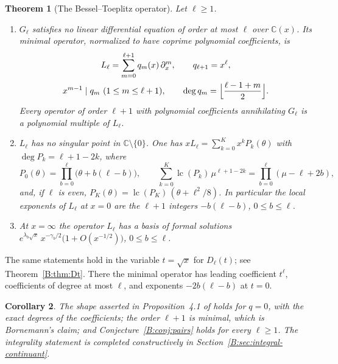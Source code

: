 \documentclass[11pt,a4paper]{article}
\newtheorem{theorem}{Theorem}[section]
\newtheorem{corollary}[theorem]{Corollary}
\theoremstyle{definition}
\theoremstyle{remark}
\newcommand{\C}{\mathbb C}
\DeclareMathOperator{\lc}{lc}
\numberwithin{equation}{section}
\begin{document}
\begin{theorem}[The Bessel--Toeplitz operator]\label{B:thm:A}
Let $\ell\ge1$.
\begin{enumerate}
\item[(a)] $G_\ell$ satisfies no linear differential equation of order at most $\ell$ over $\C(x)$. Its minimal operator, normalized to have coprime polynomial coefficients, is
\[
\begin{gathered}
L_\ell=\sum_{m=0}^{\ell+1}q_m(x)\,\partial_x^m,\qquad q_{\ell+1}=x^\ell,\\
x^{m-1}\mid q_m\ (1\le m\le\ell+1),\qquad
\deg q_m=\Bigl\lfloor\frac{\ell-1+m}{2}\Bigr\rfloor .
\end{gathered}
\]
Every operator of order $\ell+1$ with polynomial coefficients annihilating $G_\ell$ is a polynomial multiple of $L_\ell$.
\item[(b)] $L_\ell$ has no singular point in $\C\setminus\{0\}$. One has $xL_\ell=\sum_{k=0}^{K}x^kP_k(\theta)$ with $\deg P_k=\ell+1-2k$, where
\[
P_0(\theta)=\prod_{b=0}^{\ell}\bigl(\theta+b(\ell-b)\bigr),\qquad \sum_{k=0}^{K}\lc(P_k)\,\mu^{\ell+1-2k}=\prod_{b=0}^{\ell}(\mu-\ell+2b),
\]
and, if $\ell$ is even, $P_K(\theta)=\lc(P_K)\,(\theta+\ell^2/8)$. In particular the local exponents of $L_\ell$ at $x=0$ are the $\ell+1$ integers $-b(\ell-b)$, $0\le b\le \ell$.
\item[(c)] At $x=\infty$ the operator $L_\ell$ has a basis of formal solutions $e^{\lambda_b\sqrt x}\,x^{-\gamma_b/2}\bigl(1+O(x^{-1/2})\bigr)$, $0\le b\le\ell$.
\end{enumerate}
\end{theorem}

The same statements hold in the variable $t=\sqrt x$ for $D_\ell(t)$; see Theorem~\ref{B:thm:Dt}. There the minimal operator has leading coefficient $t^\ell$, coefficients of degree at most $\ell$, and exponents $-2b(\ell-b)$ at $t=0$.

\begin{corollary}\label{B:cor:FW41}
The shape asserted in Proposition~4.1 of \cite{FW26} holds for $q=0$, with the exact degrees of the coefficients; the order $\ell+1$ is minimal, which is Bornemann's claim; and Conjecture~\ref{B:conj:pairs} holds for every $\ell\ge1$. The integrality statement is completed constructively in Section~\ref{B:sec:integral-continuant}.
\end{corollary}
\end{document}
